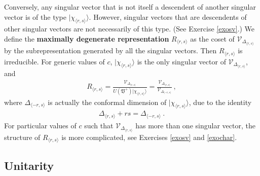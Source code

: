 \documentclass[12pt, a4paper, notitlepage, twoside]{report}
\numberwithin{equation}{section}
\theoremstyle{break}
\begin{document}
Conversely, any singular vector that is not itself a descendent of another singular vector is of the type $|\chi_{\langle r,s \rangle}\rangle$.
However, singular vectors that are descendents of other singular vectors are not necessarily of this type. (See 
Exercise \ref{exosv}.) We define the \textbf{\boldmath maximally degenerate representation} $R_{\langle r,s \rangle}$ as the coset of $\mathcal{V}_{\Delta_{\langle r,s \rangle}}$ by the subrepresentation generated by all the singular vectors. 
Then $R_{\langle r,s \rangle}$ is irreducible.
For generic values of $c$, $|\chi_{\langle r,s \rangle}\rangle$ is the only singular vector of $\mathcal{V}_{\Delta_{\langle r,s \rangle}}$, and 
\begin{align}
 R_{\langle r,s\rangle} =\frac{\mathcal{V}_{\Delta_{\langle r,s \rangle}}}{U(\mathfrak{V}^+) |\chi_{\langle r,s \rangle}\rangle }
= \frac{\mathcal{V}_{\Delta_{\langle r,s \rangle}}}{\mathcal{V}_{\Delta_{\langle -r,s \rangle}} }\ ,
\end{align}
where $\Delta_{\langle -r,s \rangle}$ is actually the conformal dimension of $|\chi_{\langle r,s \rangle}\rangle$, due to the identity
\begin{align}
 \Delta_{\langle r,s \rangle} + rs = \Delta_{\langle -r,s \rangle}\ .
\label{dmr}
\end{align}
For particular values of $c$ such that $\mathcal{V}_{\Delta_{\langle r,s \rangle}}$ has more than one singular vector, the structure of $ R_{\langle r,s\rangle}$ is more complicated, see Exercises \ref{exosv} and \ref{exochar}.



\subsection{Unitarity}\label{secuni}
\end{document}
